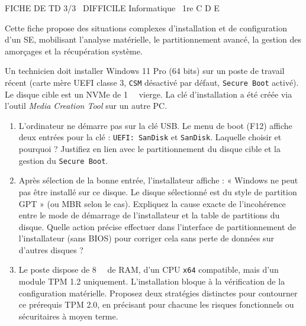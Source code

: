 \documentclass[11pt]{article}
\begin{document}
\begin{tcolorbox}[enhanced,colback=popink,colframe=popink,arc=10pt,boxrule=0pt,left=12pt,right=12pt,top=9pt,bottom=9pt]
{\color{white}\popxbold\small FICHE DE TD 3/3 \textbullet\ DIFFICILE \hfill Informatique \textbullet\ 1re C D E\par}
\end{tcolorbox}
\vspace{4pt}
Cette fiche propose des situations complexes d'installation et de configuration d'un SE, mobilisant l'analyse matérielle, le partitionnement avancé, la gestion des amorçages et la récupération système.

\begin{exercice}
Un technicien doit installer Windows 11 Pro (64 bits) sur un poste de travail récent (carte mère UEFI classe 3, \texttt{CSM} désactivé par défaut, \texttt{Secure Boot} activé). Le disque cible est un NVMe de \SI{1}{\tera\byte} vierge. La clé d'installation a été créée via l'outil \textit{Media Creation Tool} sur un autre PC.
\begin{enumerate}
    \item L'ordinateur ne démarre pas sur la clé USB. Le menu de boot (F12) affiche deux entrées pour la clé : \texttt{UEFI: SanDisk} et \texttt{SanDisk}. Laquelle choisir et pourquoi ? Justifiez en lien avec le partitionnement du disque cible et la gestion du \texttt{Secure Boot}.
    \item Après sélection de la bonne entrée, l'installateur affiche : « Windows ne peut pas être installé sur ce disque. Le disque sélectionné est du style de partition GPT » (ou MBR selon le cas). Expliquez la cause exacte de l'incohérence entre le mode de démarrage de l'installateur et la table de partitions du disque. Quelle action précise effectuer dans l'interface de partitionnement de l'installateur (sans BIOS) pour corriger cela sans perte de données sur d'autres disques ?
    \item Le poste dispose de \SI{8}{\giga\byte} de RAM, d'un CPU \texttt{x64} compatible, mais d'un module TPM 1.2 uniquement. L'installation bloque à la vérification de la configuration matérielle. Proposez deux stratégies distinctes pour contourner ce prérequis TPM 2.0, en précisant pour chacune les risques fonctionnels ou sécuritaires à moyen terme.
\end{enumerate}
\end{exercice}
\end{document}
